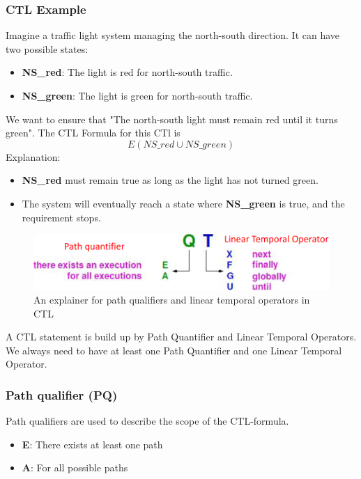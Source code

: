 \subsubsection{CTL Example}
Imagine a traffic light system managing the north-south direction. It can have two possible states:
\begin{itemize}
    \item \textbf{NS\_red}: The light is red for north-south traffic.
    \item \textbf{NS\_green}: The light is green for north-south traffic.
\end{itemize}
We want to ensure that "The north-south light must remain red until it turns green".
The CTL Formula for this CTl is
\begin{equation*}
    E (NS\_red \cup NS\_green)
\end{equation*}
Explanation:
\begin{itemize}
    \item \textbf{NS\_red} must remain true as long as the light has not turned green. 
    \item The system will eventually reach a state where \textbf{NS\_green} is true, and the requirement stops.
\end{itemize}



\begin{figure}[H]
    \centering
    \caption{An explainer for path qualifiers and linear temporal operators in CTL}
    \label{fig:ctl-pq_and_lto_cheatsheet}
    \includegraphics[width=1\linewidth]{report/GroupTemplate/images/ctl-notatio_explainer.png}
\end{figure}

A CTL statement is build up by Path Quantifier and Linear Temporal Operators. We always need to have at least one Path Quantifier and one Linear Temporal Operator. 


\subsubsection{Path qualifier (PQ)}
Path qualifiers are used to describe the scope of the CTL-formula. %
\begin{itemize}
    \item \textbf{E}: There exists at least one path
    \item \textbf{A}: For all possible paths
\end{itemize}

